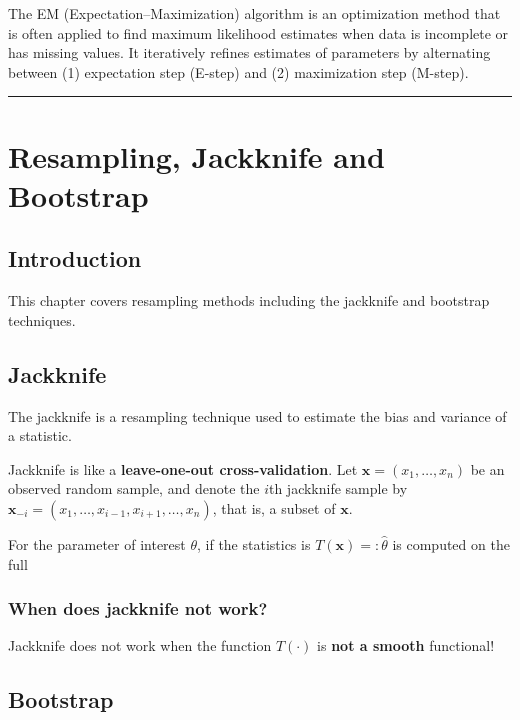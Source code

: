 \documentclass[
  letterpaper,
  DIV=11,
  numbers=noendperiod]{scrreprt}
\begin{document}
{The EM (Expectation--Maximization) algorithm is an optimization method
that is often applied to find maximum likelihood estimates when data is
incomplete or has missing values. It iteratively refines estimates of
parameters by alternating between (1) expectation step (E-step) and (2)
maximization step (M-step).

\begin{center}\rule{0.5\linewidth}{0.5pt}\end{center}


\chapter{Resampling, Jackknife and
Bootstrap}\label{resampling-jackknife-and-bootstrap}

\section{Introduction}\label{introduction}

This chapter covers resampling methods including the jackknife and
bootstrap techniques.

\section{Jackknife}\label{jackknife}

The jackknife is a resampling technique used to estimate the bias and
variance of a statistic.

Jackknife is like a \textbf{leave-one-out cross-validation}. Let
\(\mathbf{x}= (x_1,\dots,x_n)\) be an observed random sample, and denote
the \(i\)th jackknife sample by
\(\mathbf{x}_{-i} = (x_1,\dots,x_{i-1},x_{i+1},\dots,x_n)\), that is, a
subset of \(\mathbf{x}\).

For the parameter of interest \(\theta\), if the statistics is
\(T(\mathbf{x})=:\hat{\theta}\) is computed on the full

\subsection{When does jackknife not
work?}\label{when-does-jackknife-not-work}

Jackknife does not work when the function \(T(\cdot)\) is \textbf{not a
smooth} functional!

\section{Bootstrap}\label{bootstrap}

}
\end{document}
